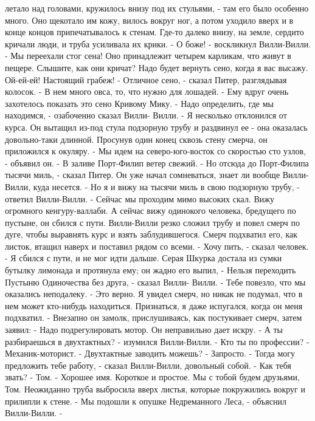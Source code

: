 летало над головами, кружилось внизу под их стульями, - там его было 
особенно много. Оно щекотало им кожу, вилось вокруг ног, а потом 
уходило вверх и в конце концов припечатывалось к стенам. Где-то далеко 
внизу, на земле, сердито кричали люди, и труба усиливала их крики.
    - О боже! - воскликнул Вилли-Вилли. - Мы переехали стог сена! Оно 
принадлежит четырем карликам, что живут в пещере. Слышите, как они 
кричат? Надо будет вернуть сено, когда я вас высажу. Ой-ей-ей! 
Настоящий грабеж!
    - Отличное сено, - сказал Питер, разглядывая колосок. - В нем 
много овса, то, что нужно для лошадей. - Ему вдруг очень захотелось 
показать это сено Кривому Мику.
    - Надо определить, где мы находимся, - озабоченно сказал Вилли-
Вилли. - Я несколько отклонился от курса.
    Он вытащил из-под стула подзорную трубу и раздвинул ее - она 
оказалась довольно-таки длинной. Просунув один конец сквозь стену 
смерча, он приложился к окуляру.
    - Мы идем на северо-юго-восток со скоростью сто узлов, - объявил 
он. - В заливе Порт-Филип ветер свежий.
    - Но отсюда до Порт-Филипа тысячи миль, - сказал Питер. Он уже 
начал сомневаться, знает ли вообще Вилли-Вилли, куда несется.
    - Но я и вижу на тысячи миль в свою подзорную трубу, - ответил 
Вилли-Вилли. - Сейчас мы проходим мимо высоких скал. Вижу огромного 
кенгуру-валлаби. А сейчас вижу одинокого человека, бредущего по 
пустыне, он сбился с пути.
    Вилли-Вилли резко сложил трубу и повел смерч по дуге, чтобы 
выравнять курс и взять заблудившегося. Смерч подхватил его, как 
листок, втащил наверх и поставил рядом со всеми.
    - Хочу пить, - сказал человек. - Я сбился с пути, и не мог идти 
дальше.
    Серая Шкурка достала из сумки бутылку лимонада и протянула ему; он 
жадно его выпил,
    - Нельзя переходить Пустыню Одиночества без друга, - сказал Вилли-
Вилли. - Тебе повезло, что мы оказались неподалеку.
    - Это верно. Я увидел смерч, но никак не подумал, что в нем может 
кто-нибудь находиться. Признаться, я даже испугался, когда он меня 
подхватил. - Внезапно он замолк, прислушиваясь, как постукивает смерч, 
затем заявил: - Надо подрегулировать мотор. Он неправильно дает искру.
    - А ты разбираешься в двухтактных? - изумился Вилли-Вилли. - Кто 
ты по профессии?
    - Механик-моторист.
    - Двухтактные заводить можешь?
    - Запросто.
    - Тогда могу предложить тебе работу, - сказал Вилли-Вилли, 
довольный собой. - Как тебя звать?
    - Том.
    - Хорошее имя. Короткое и простое. Мы с тобой будем друзьями, Том.
    Неожиданно труба выбросила вверх листья, которые покружились 
вокруг и прилипли к стене.
    - Мы подошли к опушке Недреманного Леса, - объяснил Вилли-Вилли. - 
